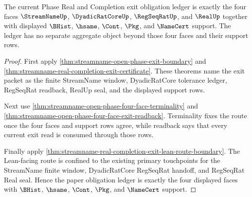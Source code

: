\begin{theorem}
\label{thm:streamname-real-completion-exit-obligation-ledger}
The current Phase Real and Completion exit obligation ledger is exactly the four faces $\StreamNameUp$, $\DyadicRatCoreUp$, $\RegSeqRatUp$, and $\RealUp$ together with displayed $\BHist$, $\hsame$, $\Cont$, $\Pkg$, and $\NameCert$ support. The ledger has no separate aggregate object beyond those four faces and their support rows.
\end{theorem}
\begin{proof}
First apply \autoref{thm:streamname-open-phase-exit-boundary} and \autoref{thm:streamname-real-completion-exit-certificate}. These theorems name the exit packet as the finite StreamName window, DyadicRatCore tolerance ledger, RegSeqRat readback, RealUp seal, and the displayed support rows.

Next use \autoref{thm:streamname-open-phase-four-face-terminality} and \autoref{thm:streamname-open-phase-four-face-exit-readback}. Terminality fixes the route once the four faces and support rows agree, while readback says that every current exit read is consumed through those rows.

Finally apply \autoref{thm:streamname-real-completion-exit-lean-route-boundary}. The Lean-facing route is confined to the existing primary touchpoints for the StreamName finite window, DyadicRatCore RegSeqRat handoff, and RegSeqRat Real seal. Hence the paper obligation ledger is exactly the four displayed faces with $\BHist$, $\hsame$, $\Cont$, $\Pkg$, and $\NameCert$ support.
\end{proof}

